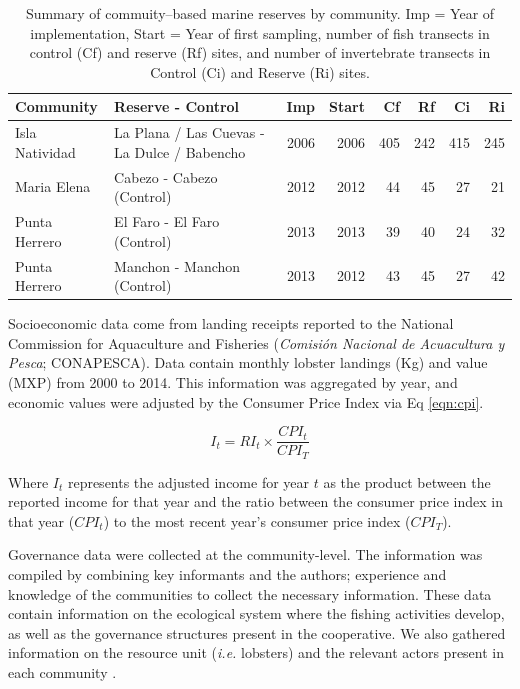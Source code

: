 \documentclass{frontiersSCNS}
\theoremstyle{definition}
\theoremstyle{definition}
\theoremstyle{definition}
\theoremstyle{remark}
\begin{document}
\begin{table}

\caption{\label{tab:unnamed-chunk-2}\label{table:com_sum} Summary of commuity--based marine reserves by community. Imp = Year of implementation, Start = Year of first sampling, number of fish transects in control (Cf) and reserve (Rf) sites, and number of invertebrate transects in Control (Ci) and Reserve (Ri) sites.}
\centering
\begin{tabular}[t]{l|l|r|r|r|r|r|r}
\hline
Community & Reserve - Control & Imp & Start & Cf & Rf & Ci & Ri\\
\hline
Isla Natividad & La Plana / Las Cuevas - La Dulce / Babencho & 2006 & 2006 & 405 & 242 & 415 & 245\\
\hline
Maria Elena & Cabezo - Cabezo (Control) & 2012 & 2012 & 44 & 45 & 27 & 21\\
\hline
Punta Herrero & El Faro - El Faro (Control) & 2013 & 2013 & 39 & 40 & 24 & 32\\
\hline
Punta Herrero & Manchon - Manchon (Control) & 2013 & 2012 & 43 & 45 & 27 & 42\\
\hline
\end{tabular}
\end{table}

Socioeconomic data come from landing receipts reported to the National
Commission for Aquaculture and Fisheries (\emph{Comisión Nacional de
Acuacultura y Pesca}; CONAPESCA). Data contain monthly lobster landings
(Kg) and value (MXP) from 2000 to 2014. This information was aggregated
by year, and economic values were adjusted by the Consumer Price Index
\citep{oecd_2017-VV} via Eq \ref{eqn:cpi}.

\begin{equation}
I_t = RI_t\times\frac{CPI_t}{CPI_T}
\label{eqn:cpi}
\end{equation}

Where \(I_t\) represents the adjusted income for year \(t\) as the
product between the reported income for that year and the ratio between
the consumer price index in that year (\(CPI_t\)) to the most recent
year's consumer price index (\(CPI_T\)).

Governance data were collected at the community-level. The information
was compiled by combining key informants and the authors; experience and
knowledge of the communities to collect the necessary information. These
data contain information on the ecological system where the fishing
activities develop, as well as the governance structures present in the
cooperative. We also gathered information on the resource unit
(\emph{i.e.} lobsters) and the relevant actors present in each community
\citep{leslie_2015-na}.
\end{document}
